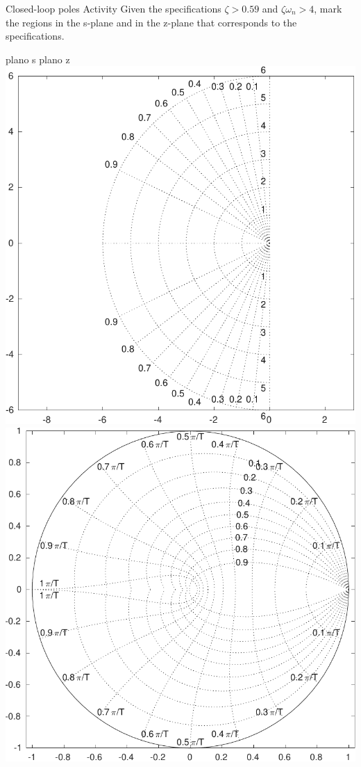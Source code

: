 \documentclass[presentation,aspectratio=169]{beamer}
\begin{document}
\begin{frame}[label={sec:orgb3cd3e5}]{Closed-loop poles}
\alert{Activity} Given the specifications \(\zeta > 0.59\) and \(\zeta\omega_n > 4\), mark the regions in the s-plane and in the z-plane that corresponds to the specifications.
\begin{center}
\alert{plano s} \hspace*{0.4\linewidth} \alert{plano z}\\
\includegraphics[height=0.61\textheight]{../../figures/sgrid-crop} \hspace*{3mm}
\includegraphics[height=0.6\textheight]{../../figures/zgrid-crop}\\
\end{center}
\end{frame}
\end{document}
